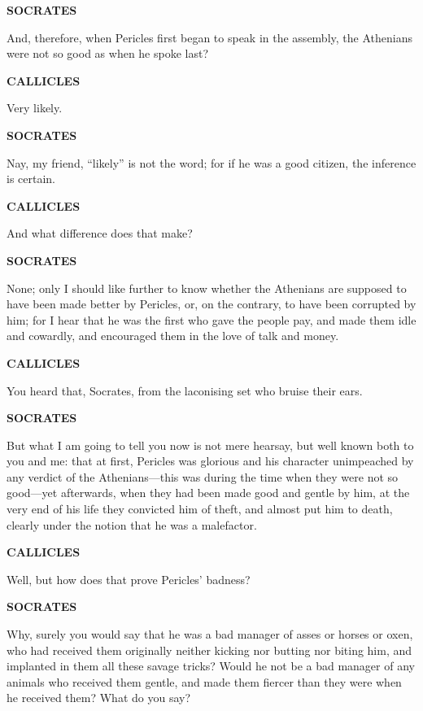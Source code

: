 \documentclass[11pt,letter]{article}
\begin{document}
\par \textbf{SOCRATES}
\par   And, therefore, when Pericles first began to speak in the assembly, the Athenians were not so good as when he spoke last?

\par \textbf{CALLICLES}
\par   Very likely.

\par \textbf{SOCRATES}
\par   Nay, my friend, “likely” is not the word; for if he was a good citizen, the inference is certain.

\par \textbf{CALLICLES}
\par   And what difference does that make?

\par \textbf{SOCRATES}
\par   None; only I should like further to know whether the Athenians are supposed to have been made better by Pericles, or, on the contrary, to have been corrupted by him; for I hear that he was the first who gave the people pay, and made them idle and cowardly, and encouraged them in the love of talk and money.

\par \textbf{CALLICLES}
\par   You heard that, Socrates, from the laconising set who bruise their ears.

\par \textbf{SOCRATES}
\par   But what I am going to tell you now is not mere hearsay, but well known both to you and me:  that at first, Pericles was glorious and his character unimpeached by any verdict of the Athenians—this was during the time when they were not so good—yet afterwards, when they had been made good and gentle by him, at the very end of his life they convicted him of theft, and almost put him to death, clearly under the notion that he was a malefactor.

\par \textbf{CALLICLES}
\par   Well, but how does that prove Pericles’ badness?

\par \textbf{SOCRATES}
\par   Why, surely you would say that he was a bad manager of asses or horses or oxen, who had received them originally neither kicking nor butting nor biting him, and implanted in them all these savage tricks? Would he not be a bad manager of any animals who received them gentle, and made them fiercer than they were when he received them? What do you say?
\end{document}
